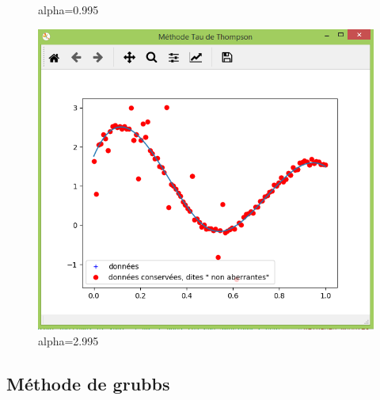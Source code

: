\documentclass[11pt]{report}
\begin{document}
\begin{figure}[!htb]
\caption{alpha=0.995}
\label{alpha_0995}
\endminipage
{}%
\includegraphics[width=\linewidth]{thoms.PNG}  
\caption{alpha=2.995}
\label{alpha_2995}
\endminipage



\end{figure}

\newpage
\subsection*{Méthode de grubbs}
 
\end{document}
